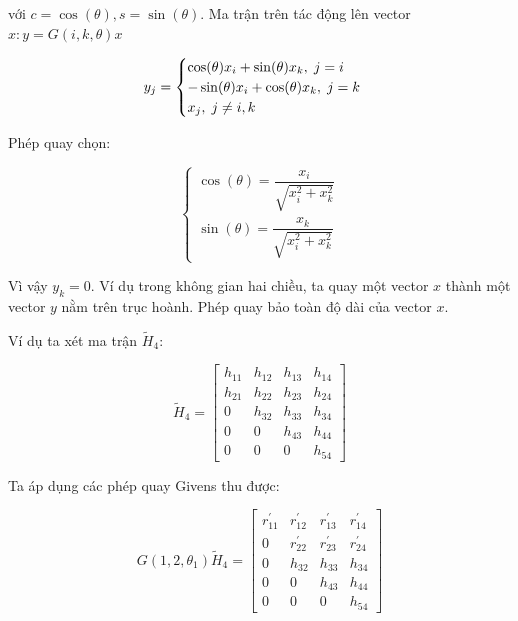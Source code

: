 \documentclass[14pt, a4paper]{article}
\numberwithin{equation}{section}
\numberwithin{algorithm}{section}
\numberwithin{figure}{section}
\numberwithin{dl}{section}
\numberwithin{md}{section}
\numberwithin{bd}{section}
\begin{document}
với $c = \cos(\theta), s = \sin(\theta)$. Ma trận trên tác động lên vector $x: y=G(i, k, \theta)x$

\begin{equation} \label{eq:Rotation-Result}
    y_j = \begin{cases}
        \cos(\theta) x_i + \sin(\theta) x_k, \thickspace j = i \\
        -\sin(\theta) x_i + \cos(\theta) x_k, \thickspace j = k \\
        x_j, \thickspace j \neq i, k
    \end{cases}
\end{equation}

Phép quay chọn:

\begin{equation}
    \begin{cases}
        \cos(\theta) = \dfrac{x_i}{\sqrt{x_i^2 + x_k^2}} \\
        \sin(\theta) = \dfrac{x_k}{\sqrt{x_i^2 + x_k^2}}
    \end{cases}
\end{equation}

Vì vậy $y_k = 0$. Ví dụ trong không gian hai chiều, ta quay một vector $x$ thành một vector $y$ nằm trên trục hoành. Phép quay bảo toàn độ dài của vector $x$.

Ví dụ ta xét ma trận $\widetilde{H}_4$:

\begin{equation}
    \widetilde{H}_4 = \begin{bmatrix} h_{11} & h_{12} & h_{13} & h_{14} \\
                                    h_{21} & h_{22} & h_{23} & h_{24} \\
                                    0 & h_{32} & h_{33} & h_{34} \\
                                    0 & 0 & h_{43} & h_{44} \\
                                    0 & 0 & 0 & h_{54}  \end{bmatrix}
\end{equation}

Ta áp dụng các phép quay Givens thu được:

\begin{equation}
    G(1, 2, \theta_1) \widetilde{H}_4 = \begin{bmatrix} r_{11}^{'} & r_{12}^{'} & r_{13}^{'} & r_{14}^{'} \\
        0 & r_{22}^{'} & r_{23}^{'} & r_{24}^{'} \\
        0 & h_{32} & h_{33} & h_{34} \\
        0 & 0 & h_{43} & h_{44} \\
        0 & 0 & 0 & h_{54}  \end{bmatrix}
\end{equation}
\end{document}
